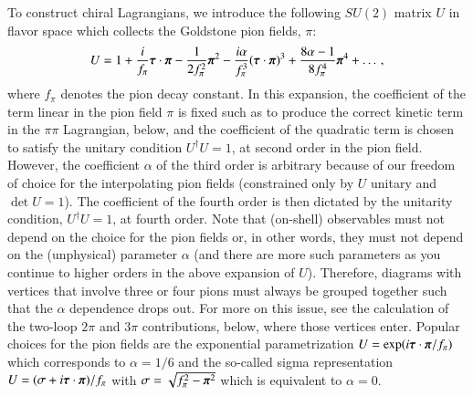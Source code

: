 \documentclass[sort&compress,preprint,3p]{elsarticle}
\begin{document}
To construct chiral Lagrangians,
we introduce the following $SU(2)$ matrix $U$ in flavor space
which collects the Goldstone pion fields,
{\boldmath $\pi$}:
\begin{equation}
U  = 1 + 
\frac{i}{f_\pi}
\mbox{\boldmath $\tau$} \cdot 
\mbox{\boldmath $\pi$}
-\frac{1}{2f_\pi^2} 
\mbox{\boldmath $\pi$}^2
-\frac{i\alpha}{f_\pi^3}
(\mbox{\boldmath $\tau$} \cdot \mbox{\boldmath $\pi$})^3
+\frac{8\alpha-1}{8f_\pi^4} 
\mbox{\boldmath $\pi$}^4
+ \ldots  \,,
\label{eq_U}
\end{equation}
where $f_\pi$ denotes the pion decay constant.
In this expansion, the coefficient of the 
term linear 
in the pion field 
{\boldmath $\pi$}
is fixed such as to produce the correct kinetic
term in the $\pi\pi$ Lagrangian, below,
and the coefficient of the
quadratic term is chosen 
to satisfy the unitary condition $U^\dagger U = 1$,
at second order in the pion field.
However, the coefficient $\alpha$
of the third order is arbitrary
because of our freedom of choice for the interpolating
pion fields
(constrained only by $U$ unitary and $\det U = 1$).
The coefficient of the fourth order is then
dictated by the unitarity condition,
$U^\dagger U = 1$, at fourth order.
Note that (on-shell) observables must not depend
on the choice for the pion fields 
or, in other words, they must not depend
on the (unphysical) parameter $\alpha$ (and there are more
such parameters as you continue to higher orders
in the above expansion of $U$).
Therefore, diagrams with vertices that involve
three or four pions must always be grouped together
such that the $\alpha$ dependence drops out.
For more on this issue, see the calculation of the
two-loop $2\pi$ and $3\pi$ contributions, below,
where those vertices enter.
Popular choices for the pion fields are 
the exponential parametrization
$U=\exp
(i\mbox{\boldmath $\tau$} \cdot \mbox{\boldmath $\pi$}
/f_\pi)$ which corresponds to 
$\alpha=1/6$
and the so-called sigma representation
$U = ( \sigma +
i\mbox{\boldmath $\tau$} \cdot \mbox{\boldmath $\pi$} )
/f_\pi$
with
$\sigma=\sqrt{f_\pi^2- \mbox{\boldmath $\pi$}^2}$
which is equivalent to
$\alpha=0$.
\end{document}
